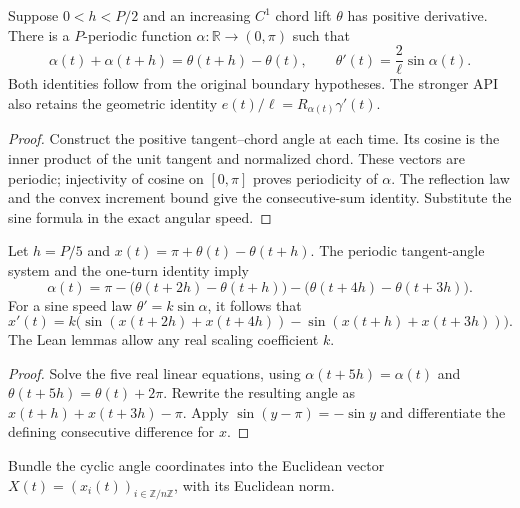 \begin{proposition}
\label{prop:boundary-tangent-angles}
\leanok
{}
Suppose $0<h<P/2$ and an increasing $C^1$ chord lift $\theta$ has
positive derivative. There is a $P$-periodic function
$\alpha:\mathbb R\to(0,\pi)$ such that
\[
 \alpha(t)+\alpha(t+h)=\theta(t+h)-\theta(t),\qquad
 \theta'(t)=\frac2\ell\sin\alpha(t).
\]
Both identities follow from the original boundary hypotheses. The stronger
API also retains the geometric identity
$e(t)/\ell=R_{\alpha(t)}\gamma'(t)$.
\end{proposition}
\begin{proof}
\leanok
Construct the positive tangent--chord angle at each time. Its cosine is
the inner product of the unit tangent and normalized chord. These vectors
are periodic; injectivity of cosine on $[0,\pi]$ proves periodicity of
$\alpha$. The reflection law and the convex increment bound give the
consecutive-sum identity. Substitute the sine formula in the exact
angular speed.
\end{proof}

\begin{lemma}
\label{lem:five-angle-relations}
\leanok
{}
Let $h=P/5$ and $x(t)=\pi+\theta(t)-\theta(t+h)$.
The periodic tangent-angle system and the one-turn identity imply
\[
 \alpha(t)=\pi-\bigl(\theta(t+2h)-\theta(t+h)\bigr)
                 -\bigl(\theta(t+4h)-\theta(t+3h)\bigr).
\]
For a sine speed law $\theta'=k\sin\alpha$, it follows that
\[
 x'(t)=k\bigl(\sin(x(t+2h)+x(t+4h))
                  -\sin(x(t+h)+x(t+3h))\bigr).
\]
The Lean lemmas allow any real scaling coefficient $k$.
\end{lemma}
\begin{proof}
\leanok
Solve the five real linear equations, using $\alpha(t+5h)=\alpha(t)$
and $\theta(t+5h)=\theta(t)+2\pi$. Rewrite the resulting angle as
$x(t+h)+x(t+3h)-\pi$. Apply $\sin(y-\pi)=-\sin y$ and differentiate
the defining consecutive difference for $x$.
\end{proof}

\begin{definition}
\label{def:cyclic-angle-curve}
\leanok
{}
Bundle the cyclic angle coordinates into the Euclidean vector
$X(t)=(x_i(t))_{i\in\mathbb Z/n\mathbb Z}$, with its Euclidean norm.
\end{definition}

